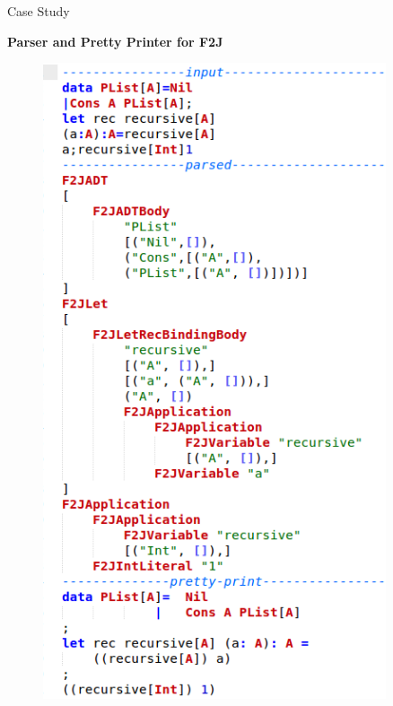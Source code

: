 \documentclass[final]{beamer}
\newlength{\sepwid}
\newlength{\onecolwid}
\newlength{\twocolwid}
\begin{document}
\begin{frame}[t]
\begin{columns}[t]
\begin{column}{\twocolwid}
\begin{columns}[t,totalwidth=\twocolwid]
\begin{column}{\onecolwid}
\end{column} %

\end{columns} %

\end{column} %

\begin{column}{\sepwid}\end{column} %

\begin{column}{\onecolwid} %


\begin{block}{Case Study}

\textbf{Parser and Pretty Printer for F2J}

\begin{figure}
\includegraphics[width=\linewidth]{img/cs.jpg}


\end{figure}
\end{block}
\end{column}
\end{columns}
\end{frame}
\end{document}

